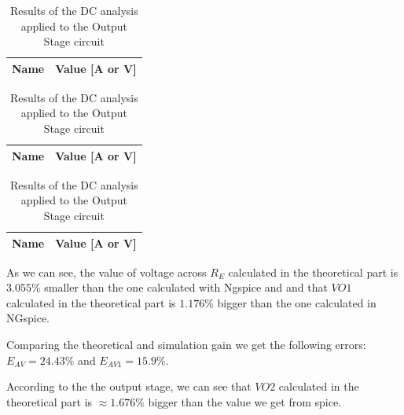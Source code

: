 \begin{table}
    \parbox{.45\linewidth}{
        \centering
        \begin{tabular}{|c|c|}
            \hline
            {\bf Name} & {\bf Value [A or V]} \\ \hline
            
        \end{tabular}
        \label{tab:GainStage_OP}
        \caption{Results of the DC analysis applied to the Gain Stage circuit}
    }
    \hfill
    \parbox{.45\linewidth}{
        \centering
        \begin{tabular}{|c|c|}
            {\bf Name} & {\bf Value [A or V]} \\ \hline
            
            \hline
        \end{tabular}
        \label{tab:Spice_OP}
        \caption{Results of the OP analysis applied to the whole circuit by using the Ngspice}
    }
    \hfill
    \parbox{.45\linewidth}{
        \centering
        \begin{tabular}{|c|c|}
            {\bf Name} & {\bf Value [A or V]} \\ \hline
            
            \hline
        \end{tabular}
        \label{tab:OutputStage_OP}
        \caption{Results of the DC analysis applied to the Output Stage circuit }
    }
\end{table}

As we can see, the value of voltage across $R_E$ calculated in the 
theoretical part is $3.055\%$ smaller than the one calculated with 
Ngspice and and that $VO1$ calculated in the theoretical part is 
$1.176\%$ bigger than the one calculated in NGspice.

Comparing the theoretical and simulation gain we get the following errors:
$E_{AV} = 24.43\%$ and $E_{AV1} = 15.9\%$.

According to the the output stage, we can see that $VO2$ calculated 
in the theoretical part is $\approx 1.676\%$ bigger than the value 
we get from spice.

